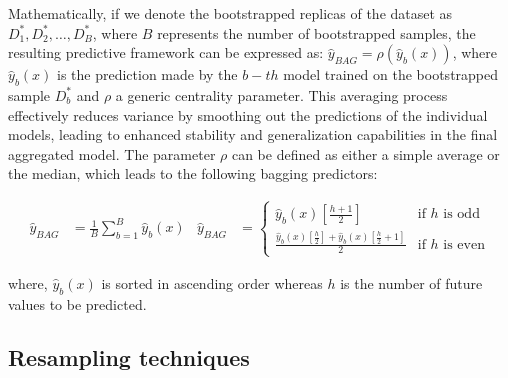 \documentclass[review,a4paper,fleqn,3p,11pt,authoryear]{elsarticle}
\begin{document}
Mathematically, if we denote the bootstrapped replicas of the dataset as $D^*_1, D^*_2, \ldots, D^*_B$, where $B$  represents the number of bootstrapped samples, the resulting predictive framework can be expressed as:  $\hat{y}_{\textit{BAG}} = \rho( \hat{y}_{b}(x) )$, where $\hat{y}_{b}(x)$ is the prediction made by the $b-th$ model trained on the bootstrapped sample $ D^*_b $  and $\rho$ a generic centrality parameter. 
This averaging process effectively reduces variance by smoothing out the predictions of the individual models, leading to enhanced stability and generalization capabilities in the final aggregated model.  The parameter $\rho$ can be defined as either a simple average or the median, which leads to the following bagging predictors:

\begin{align}
	\hat{y}_{\textit{BAG}} &= \frac{1}{B} \sum_{b=1}^{B} \hat{y}_{b}(x) &
	\hat{y}_{\textit{BAG}} &=
	\begin{cases}
		\hat{y}_{b}(x)\left[\frac{h+1}{2}\right] & \text{if } h \text{ is odd} \\
		\frac{\hat{y}_{b}(x)\left[\frac{h}{2}\right] + \hat{y}_{b}(x)\left[\frac{h}{2} + 1\right]}{2} & \text{if } h \text{ is even}
	\end{cases}
\end{align}

\noindent where, $\hat{y}_{b}(x)$  is  sorted in ascending order whereas $h$ is the number of future values to be predicted.

\subsection{Resampling techniques} \label{Subsec:resampling}
\end{document}
